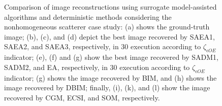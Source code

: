\begin{figure}[!h]
				\caption[Nonhomogeneous scatterer case study: Comparison of image reconstructions using surrogate model-assisted algorithms and deterministic methods.]{Comparison of image reconstructions using surrogate model-assisted algorithms and deterministic methods considering the nonhomogeneous scatterer case study: (a) shows the ground-truth image; (b), (c), and (d) depict the best image recovered by SAEA1, SAEA2, and SAEA3, respectively, in 30 execution according to $\zeta_{\epsilon OE}$ indicator; (e), (f) and (g) show the best image recovered by SADM1, SADM2, and EA, respectively, in 30 execution according to $\zeta_{\epsilon OE}$ indicator; (g) shows the image recovered by BIM, and (h) shows the image recovered by DBIM; finally, (i), (k), and (l) show the image recovered by CGM, ECSI, and SOM, respectively.}
				\label{fig:results:casestudy:nonhomogeneous:reconstruction}
			\end{figure}
		
			
